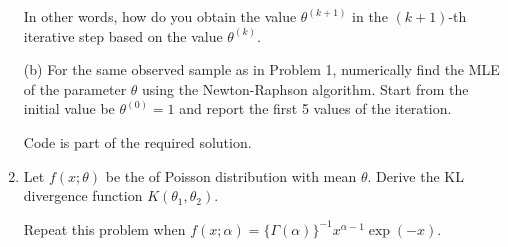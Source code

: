 \begin{enumerate}
In other words, how do you obtain the value $ \theta^{ (k + 1) } $ 
in the $ (k + 1) $-th iterative step based on the value $ \theta^{ (k) } $. 

(b) For the same observed sample as in Problem 1, numerically find the MLE of the 
parameter $ \theta $ using the Newton-Raphson algorithm. Start from the initial value be $\theta^{(0)} = 1$ and report
the first 5 values of the iteration.

Code is part of the required solution.

\item
Let $f(x; \theta)$ be the \pmf of Poisson distribution with mean $\theta$.
Derive the KL divergence function $K(\theta_1, \theta_2)$.

Repeat this problem when $f(x; \alpha) =\{\Gamma(\alpha)\}^{-1}  x^{\alpha-1} \exp( - x)$.
\end{enumerate}


